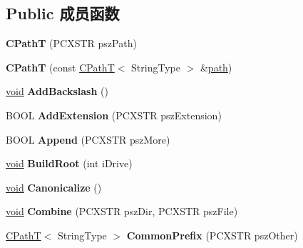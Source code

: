 \subsection*{Public 成员函数}
\begin{DoxyCompactItemize}
\item 
\mbox{\label{class_a_t_l_1_1_c_path_t_a6f36d9e0307b6ec1b5ed22b0ae2beee9}} 
{\bfseries C\+PathT} (P\+C\+X\+S\+TR psz\+Path)
\item 
\mbox{\label{class_a_t_l_1_1_c_path_t_ac91a77885bd74982bfaf4310a67d7b1d}} 
{\bfseries C\+PathT} (const \hyperlink{class_a_t_l_1_1_c_path_t}{C\+PathT}$<$ String\+Type $>$ \&\hyperlink{structpath}{path})
\item 
\mbox{\label{class_a_t_l_1_1_c_path_t_a066c6247d1c09ff5d130257b19e30e26}} 
\hyperlink{interfacevoid}{void} {\bfseries Add\+Backslash} ()
\item 
\mbox{\label{class_a_t_l_1_1_c_path_t_a17f1bbd68f02aabc79d6292ff2f12ba7}} 
B\+O\+OL {\bfseries Add\+Extension} (P\+C\+X\+S\+TR psz\+Extension)
\item 
\mbox{\label{class_a_t_l_1_1_c_path_t_a4806baf559c6105ea7b5e6aac1a31e3e}} 
B\+O\+OL {\bfseries Append} (P\+C\+X\+S\+TR psz\+More)
\item 
\mbox{\label{class_a_t_l_1_1_c_path_t_a3a21e8299c68bb1b9c44107fcfec2bf5}} 
\hyperlink{interfacevoid}{void} {\bfseries Build\+Root} (int i\+Drive)
\item 
\mbox{\label{class_a_t_l_1_1_c_path_t_a083204ce18c38477ab79c68246b88664}} 
\hyperlink{interfacevoid}{void} {\bfseries Canonicalize} ()
\item 
\mbox{\label{class_a_t_l_1_1_c_path_t_a1da4262eb62d47af0f6194162c3026a7}} 
\hyperlink{interfacevoid}{void} {\bfseries Combine} (P\+C\+X\+S\+TR psz\+Dir, P\+C\+X\+S\+TR psz\+File)
\item 
\mbox{\label{class_a_t_l_1_1_c_path_t_aac79be8d8c17ab1dbb52549a55efc36a}} 
\hyperlink{class_a_t_l_1_1_c_path_t}{C\+PathT}$<$ String\+Type $>$ {\bfseries Common\+Prefix} (P\+C\+X\+S\+TR psz\+Other)

\end{DoxyCompactItemize}
